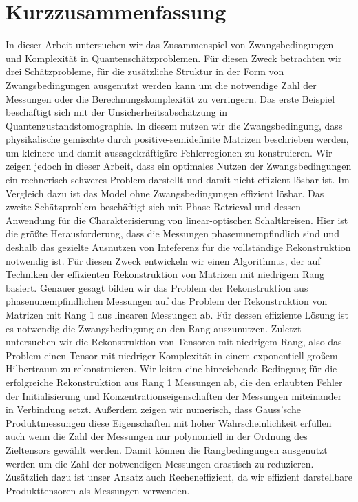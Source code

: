 \documentclass[
  a4paper,
  11pt,
  BCOR=8mm,
  twoside,
  headsepline]{scrbook}
\begin{document}
\chapter*{Kurzzusammenfassung}

In dieser Arbeit untersuchen wir das Zusammenspiel von Zwangsbedingungen und Komplexität in Quantenschätzproblemen.
Für diesen Zweck betrachten wir drei Schätzprobleme, für die zusätzliche Struktur in der Form von Zwangsbedingungen ausgenutzt werden kann um die notwendige Zahl der Messungen oder die Berechnungskomplexität zu verringern.
Das erste Beispiel beschäftigt sich mit der Unsicherheitsabschätzung in Quantenzustandstomographie.
In diesem nutzen wir die Zwangsbedingung, dass physikalische gemischte durch positive-semidefinite Matrizen beschrieben werden, um kleinere und damit aussagekräftigäre Fehlerregionen zu konstruieren.
Wir zeigen jedoch in dieser Arbeit, dass ein optimales Nutzen der Zwangsbedingungen ein rechnerisch schweres Problem darstellt und damit nicht effizient lösbar ist.
Im Vergleich dazu ist das Model ohne Zwangsbedingungen effizient lösbar.
Das zweite Schätzproblem beschäftigt sich mit Phase Retrieval und dessen Anwendung für die Charakterisierung von linear-optischen Schaltkreisen.
Hier ist die größte Herausforderung, dass die Messungen phasenunempfindlich sind und deshalb das gezielte Ausnutzen von Inteferenz für die vollständige Rekonstruktion notwendig ist.
Für diesen Zweck entwickeln wir einen Algorithmus, der auf Techniken der effizienten Rekonstruktion von Matrizen mit niedrigem Rang basiert.
Genauer gesagt bilden wir das Problem der Rekonstruktion aus phasenunempfindlichen Messungen auf das Problem der Rekonstruktion von Matrizen mit Rang 1 aus linearen Messungen ab.
Für dessen effiziente Lösung ist es notwendig die Zwangsbedingung an den Rang auszunutzen.
Zuletzt untersuchen wir die Rekonstruktion von Tensoren mit niedrigem Rang, also das Problem einen Tensor mit niedriger Komplexität in einem exponentiell großem Hilbertraum zu rekonstruieren.
Wir leiten eine hinreichende Bedingung für die erfolgreiche Rekonstruktion aus Rang 1 Messungen ab, die den erlaubten Fehler der Initialisierung und Konzentrationseigenschaften der Messungen miteinander in Verbindung setzt.
Außerdem zeigen wir numerisch, dass Gauss'sche Produktmessungen diese Eigenschaften mit hoher Wahrscheinlichkeit erfüllen auch wenn die Zahl der Messungen nur polynomiell in der Ordnung des Zieltensors gewählt werden.
Damit können die Rangbedingungen ausgenutzt werden um die Zahl der notwendigen Messungen drastisch zu reduzieren.
Zusätzlich dazu ist unser Ansatz auch Recheneffizient, da wir effizient darstellbare Produkttensoren als Messungen verwenden.
\end{document}
